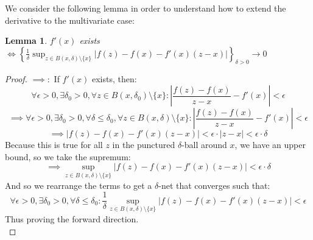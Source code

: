 \documentclass[10pt,letterpaper]{article} %
\newtheorem{lem}{Lemma}[section]
\begin{document}
We consider the following lemma in order to understand how to extend the derivative to the multivariate case:
\begin{lem}
$f'(x)$ exists $\iff \left\{\frac{1}{\delta}\sup_{z \in B(x, \delta)\setminus \{x\}}|f(z) - f(x) - f'(x)(z-x)|\right\}_{\delta > 0} \xrightarrow{} 0$\\

\end{lem}
\begin{proof}
$\implies:$ If $f'(x)$ exists, then:
\begin{equation*}
\forall \epsilon > 0, \exists \delta_0 > 0, \forall z \in B(x, \delta_0) \setminus \{x\}: \left|\frac{f(z) - f(x)}{z-x} - f'(x)\right| < \epsilon
\end{equation*}
\begin{equation*}
\implies \forall \epsilon >0, \exists \delta_0 > 0, \forall \delta \leqslant \delta_0, \forall z \in B(x, \delta)\setminus \{x\}: \left|\frac{f(z) - f(x)}{z-x} - f'(x)\right| < \epsilon
\end{equation*}
\begin{equation*}
\implies |f(z) -f(x) - f'(x)(z-x)| < \epsilon \cdot |z-x| < \epsilon \cdot \delta
\end{equation*}
Because this is true for all $z$ in the punctured $\delta$-ball around $x$, we have an upper bound, so we take the supremum:
\begin{equation*}
\implies \sup_{z \in B(x, \delta) \setminus \{x\}}|f(z) - f(x) - f'(x)(z-x)| < \epsilon \cdot \delta
\end{equation*}
And so we rearrange the terms to get a $\delta$-net that converges such that:
\begin{equation*}
\forall \epsilon > 0, \exists \delta_0 > 0, \forall \delta \leqslant \delta_0: \frac{1}{\delta}\sup_{z \in B(x, \delta)\setminus \{x\}}|f(z) - f(x) - f'(x)(z-x)| < \epsilon
\end{equation*}
Thus proving the forward direction.\\


\end{proof}
\end{document}
